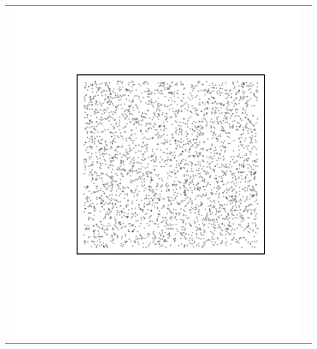 \documentclass{article}\usepackage{graphicx, color}
\makeatletter
\def\maxwidth{ %
  \ifdim\Gin@nat@width>\linewidth
    \linewidth
  \else
    \Gin@nat@width
  \fi
}
\newenvironment{knitrout}{}{} %
\makeatother
\begin{document}
\vspace*{-1.in}
\begin{tabular}{cc}
\begin{knitrout}
\definecolor{shadecolor}{rgb}{0.969, 0.969, 0.969}\color{fgcolor}\includegraphics[width=\maxwidth]{figure/unnamed-chunk-25} 
\end{knitrout}


\end{tabular}
\end{document}
